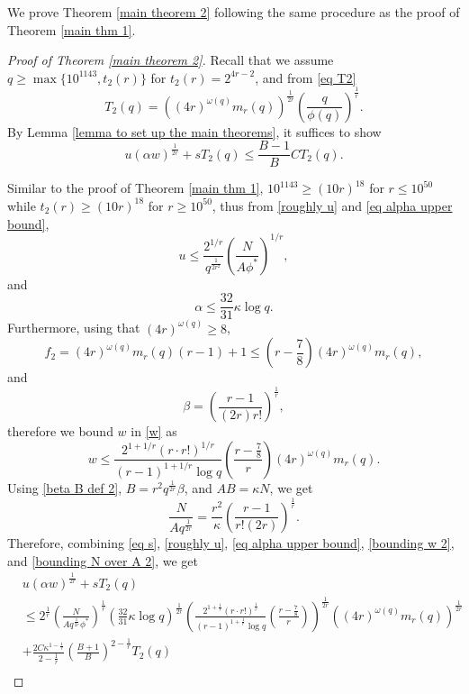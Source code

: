 \documentclass[12pt]{amsart}
\theoremstyle{plain}
\theoremstyle{definition}
\begin{document}
We prove Theorem \ref{main theorem 2} following the same procedure as the proof of Theorem \ref{main thm 1}.
\begin{proof}[Proof of Theorem \ref{main theorem 2}]
Recall that we assume $q\ge \max\{10^{1143}, t_2(r)\}$ for $t_2(r)=2^{4r-2}$, and from \eqref{eq T2}
$$T_2(q) = \left((4r)^{\omega(q)}m_r(q)\right)^{\frac{1}{2r}}\left(\frac{q}{\phi(q)}\right)^{\frac{1}{r}}.$$
By Lemma \ref{lemma to set up the main theorems}, it suffices to show
\begin{equation*}
u(\alpha w)^{\frac{1}{2r}} + sT_2(q) \le \frac{B-1}{B} C T_2(q).
\end{equation*}

Similar to the proof of Theorem \ref{main thm 1}, $10^{1143}\ge (10r)^{18}$ for $r\le 10^{50}$ while $t_2(r) \ge (10r)^{18}$ for $r\ge 10^{50}$, thus from \eqref{roughly u} and \eqref{eq alpha upper bound},
\begin{equation*}
    u \le \frac{2^{1/r}}{q^{\frac{1}{2r^2}}}\left(\frac{N}{A\phi^*}\right)^{1/r},
\end{equation*}
and 
\[
\alpha \le \frac{32}{31}\kappa \log{q}.
\]
Furthermore, using that $(4r)^{\omega(q)}\ge 8$,
\begin{equation}\label{f2}
f_2 = (4r)^{\omega(q)}m_r(q)(r-1)+1 \le \left(r-\frac{7}{8}\right)(4r)^{\omega(q)}m_r(q),
\end{equation}
and \begin{equation}\label{beta B def 2}\beta = \left(\frac{r-1}{(2r)r!}\right)^{\frac{1}{r}},
\end{equation}
therefore we bound $w$ in \eqref{w} as
\begin{equation}\label{bounding w 2}
    w \le \frac{2^{1+1/r}(r\cdot r!)^{1/r}}{(r-1)^{1+1/r}\log q} \left(\frac{r-\frac{7}{8}}{r}\right)\left(4r\right)^{\omega(q)}m_r(q).
\end{equation}
Using \eqref{beta B def 2}, $B = r^2q^{\frac{1}{2r}} \beta$, and $AB = \kappa N$,  we get
\begin{equation}\label{bounding N over A 2}
\frac{N}{A q^{\frac{1}{2r}}} = \frac{r^2}{\kappa}\left(\frac{r-1}{r!(2r)}\right)^{\frac{1}{r}}.
\end{equation}
Therefore, combining \eqref{eq s}, \eqref{roughly u}, \eqref{eq alpha upper bound}, \eqref{bounding w 2}, and \eqref{bounding N over A 2}, we get 
\begin{align*}
    &u(\alpha w)^{\frac{1}{2r}}+sT_2(q)\\ 
    &\le 2^{\frac{1}{r}}\left(\frac{N}{Aq^{\frac{1}{2r}}\phi^*}\right)^{\frac{1}{r}}\left(\frac{32}{31}\kappa \log{q}\right)^{\frac{1}{2r}}\left(\frac{2^{1+\frac{1}{r}}(r\cdot r!)^{\frac{1}{r}}}{(r-1)^{1+\frac{1}{r}}\log{q}}\left(\frac{r-\frac{7}{8}}{r}\right)\right)^{\frac{1}{2r}}\left((4r)^{\omega(q)}m_r(q)\right)^{\frac{1}{2r}}\\ &+\frac{2C\kappa^{1-\frac{1}{r}}}{2-\frac{1}{r}}\left(\frac{B+1}{B}\right)^{2-\frac{1}{r}}T_2(q)\\

\end{align*}
\end{proof}
\end{document}

